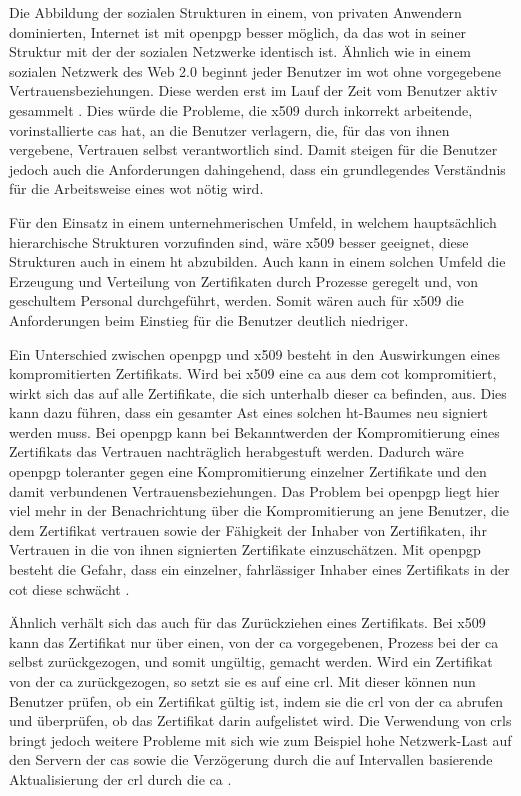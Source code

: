 Die Abbildung der sozialen Strukturen in einem, von privaten Anwendern dominierten, Internet ist mit \gls{openpgp} besser möglich, da das \gls{wot} in
seiner Struktur mit der der sozialen Netzwerke identisch ist. Ähnlich wie in einem sozialen Netzwerk des Web 2.0 beginnt jeder Benutzer im \gls{wot} ohne
vorgegebene Vertrauensbeziehungen. Diese werden erst im Lauf der Zeit vom Benutzer aktiv gesammelt \cite{pki:perlman}. Dies würde die Probleme, die \gls{x509}
durch inkorrekt arbeitende, vorinstallierte \glspl{ca} hat, an die Benutzer verlagern, die, für das von ihnen vergebene, Vertrauen selbst verantwortlich sind.
Damit steigen für die Benutzer jedoch auch die Anforderungen dahingehend, dass ein grundlegendes Verständnis für die Arbeitsweise eines \gls{wot} nötig wird.

Für den Einsatz in einem unternehmerischen Umfeld, in welchem hauptsächlich hierarchische Strukturen vorzufinden sind, wäre \gls{x509} besser geeignet,
diese Strukturen auch in einem \gls{ht} abzubilden. Auch kann in einem solchen Umfeld die Erzeugung und Verteilung von Zertifikaten durch Prozesse geregelt und,
von geschultem Personal durchgeführt, werden. Somit wären auch für \gls{x509} die Anforderungen beim Einstieg für die Benutzer deutlich niedriger.

Ein Unterschied zwischen \gls{openpgp} und \gls{x509} besteht in den Auswirkungen eines kompromitierten Zertifikats. Wird bei \gls{x509} eine \gls{ca} aus
dem \gls{cot} kompromitiert, wirkt sich das auf alle Zertifikate, die sich unterhalb dieser \gls{ca} befinden, aus. Dies kann dazu führen, dass ein gesamter Ast
eines solchen \gls{ht}-Baumes neu signiert werden muss. Bei \gls{openpgp} kann bei Bekanntwerden der Kompromitierung eines Zertifikats das Vertrauen nachträglich
herabgestuft werden\cite{pgp}. Dadurch wäre \gls{openpgp} toleranter gegen eine Kompromitierung einzelner Zertifikate und den damit verbundenen
Vertrauensbeziehungen. Das Problem bei \gls{openpgp} liegt hier viel mehr in der Benachrichtung über die Kompromitierung an jene Benutzer, die dem Zertifikat
vertrauen sowie der Fähigkeit der Inhaber von Zertifikaten, ihr Vertrauen  in die von ihnen signierten Zertifikate einzuschätzen. Mit \gls{openpgp} besteht die
Gefahr, dass ein einzelner, fahrlässiger Inhaber eines Zertifikats in der \gls{cot} diese schwächt \cite{pki:perlman}.

Ähnlich verhält sich das auch für das Zurückziehen eines Zertifikats. Bei \gls{x509} kann das Zertifikat nur über einen, von der \gls{ca} vorgegebenen, Prozess
bei der \gls{ca} selbst zurückgezogen, und somit ungültig, gemacht werden. Wird ein Zertifikat von der \gls{ca} zurückgezogen, so setzt sie es auf eine
\gls{crl}. Mit dieser können nun Benutzer prüfen, ob ein Zertifikat gültig ist, indem sie die \gls{crl} von der \gls{ca} abrufen und überprüfen, ob das
Zertifikat darin aufgelistet wird. Die Verwendung von \glspl{crl} bringt jedoch weitere Probleme mit sich wie zum Beispiel hohe Netzwerk-Last auf den Servern
der \glspl{ca} sowie die Verzögerung durch die auf Intervallen basierende Aktualisierung der \gls{crl} durch die \gls{ca} \cite{10.1109/MC.2002.1023787}. 

